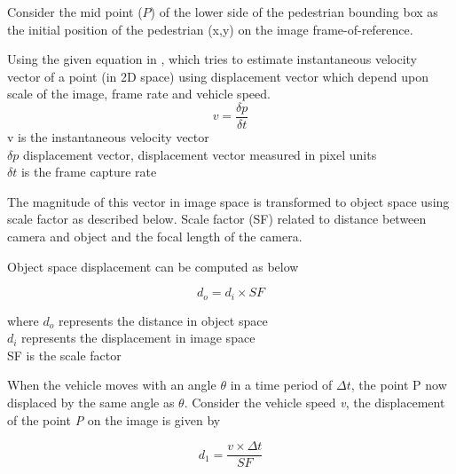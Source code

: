 Consider the mid point ($P$) of the lower side of the pedestrian bounding box as the initial position of the pedestrian (x,y) on the image frame-of-reference.




Using the given equation in \cite{dougan2010real}, which tries to estimate instantaneous velocity vector of a point (in 2D space) using displacement vector which depend upon scale of the image, frame rate and vehicle speed.
\begin{equation} \label{conversion}
{v}= \frac{\delta p}{\delta t}
\end{equation} 
v is the instantaneous velocity vector \\
${\delta p}$ displacement vector, displacement vector measured in pixel units \\
${\delta t}$ is the frame capture rate

The magnitude of this vector in image space is transformed to object space using scale factor as described below. Scale factor (SF) related to distance between camera and object and the focal length of the camera.

Object space displacement can be computed as below

\begin{equation} \label{conversion}
{d_o}= {d_i} \times SF
\end{equation} 

where $d_o$ represents the distance in object space \\
$d_i$ represents the displacement in image space \\
SF is the scale factor

When the vehicle moves with an angle ${\theta }$ in a time period of ${\Delta t}$, the point P now displaced by the same angle as ${\theta}$. Consider the vehicle speed \textit{v}, the displacement of the point \textit{P} on the image is given by

\begin{equation} \label{distance-in-pixel}
{d_1}= \frac{v \times \Delta t}{SF}
\end{equation} 

